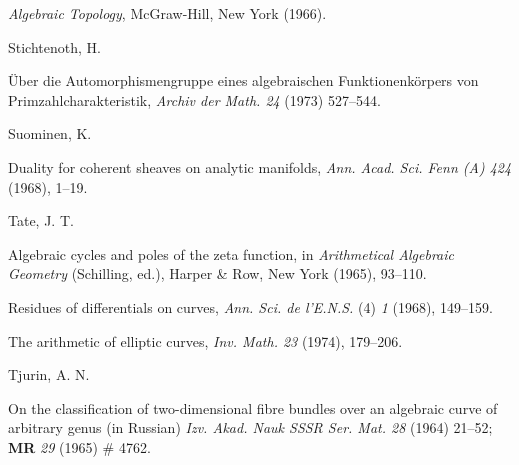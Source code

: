{\emph{Algebraic Topology}, McGraw-Hill, New York (1966).\par
\par\vspace{2.15pt}\noindent \hypertarget{bib-482-12}{}Stichtenoth, H.\par
\noindent\hangindent=25bp\hspace*{6bp}%
\"Uber die Automorphismengruppe eines algebraischen Funktionenk\"orpers von Primzahlcharakteristik, \emph{Archiv der Math. 24} (1973) 527--544.\par
\par\vspace{2.15pt}\noindent \hypertarget{bib-482-13}{}Suominen, K.\par
\noindent\hangindent=25bp\hspace*{6bp}%
Duality for coherent sheaves on analytic manifolds, \emph{Ann. Acad. Sci. Fenn (A) 424} (1968), 1--19.\par
\par\vspace{2.15pt}\noindent \hypertarget{bib-482-14}{}Tate, J. T.\par
\noindent\hangindent=25bp\hspace*{6bp}%
Algebraic cycles and poles of the zeta function, in \emph{Arithmetical Algebraic Geometry} (Schilling, ed.), Harper \& Row, New York (1965), 93--110.\par
\noindent\hangindent=25bp\hspace*{6bp}%
Residues of differentials on curves, \emph{Ann. Sci. de l'E.N.S.} (4) \emph{1} (1968), 149--159.\par
\noindent\hangindent=25bp\hspace*{6bp}%
The arithmetic of elliptic curves, \emph{Inv. Math. 23} (1974), 179--206.\par
\par\vspace{2.15pt}\noindent \hypertarget{bib-482-17}{}Tjurin, A. N.\par
\noindent\hangindent=25bp\hspace*{6bp}%
On the classification of two-dimensional fibre bundles over an algebraic curve of arbitrary genus (in Russian) \emph{Izv. Akad. Nauk SSSR Ser. Mat. 28} (1964) 21--52; \textbf{MR} \emph{29} (1965) \# 4762.\par
}
